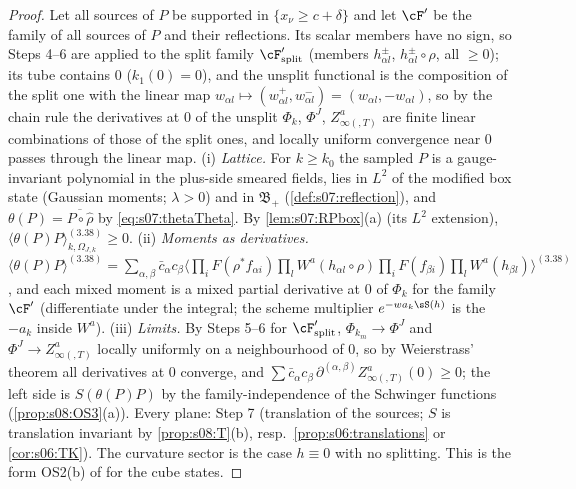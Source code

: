 \begin{proof}
Let all sources of $P$ be supported in $\{x_\nu\ge c+\delta\}$ and let $\cF'$ be the family of all sources of $P$ and their reflections. Its scalar members have no sign, so Steps 4--6 are applied to the split family $\cF'_{\rm split}$ (members $h^\pm_{\alpha l}$, $h^\pm_{\alpha l}\circ\rho$, all $\ge0$); its tube contains $0$ ($k_1(0)=0$), and the unsplit functional is the composition of the split one with the linear map $w_{\alpha l}\mapsto(w^+_{\alpha l},w^-_{\alpha l})=(w_{\alpha l},-w_{\alpha l})$, so by the chain rule the derivatives at $0$ of the unsplit $\Phi_k$, $\Phi^J$, $Z^a_{\infty(,T)}$ are finite linear combinations of those of the split ones, and locally uniform convergence near $0$ passes through the linear map. (i) \emph{Lattice.} For $k\ge k_0$ the sampled $P$ is a gauge-invariant polynomial in the plus-side smeared fields, lies in $L^2$ of the modified box state (Gaussian moments; $\lambda>0$) and in $\mathfrak B_+$ (\cref{def:s07:reflection}), and $\theta(P)=\overline{P\circ\hat\rho}$ by \eqref{eq:s07:thetaTheta}. By \cref{lem:s07:RPbox}(a) (its $L^2$ extension), $\langle\theta(P)P\rangle^{(3.38)}_{k,\Omega_{J,k}}\ge0$. (ii) \emph{Moments as derivatives.} $\langle\theta(P)P\rangle^{(3.38)}=\sum_{\alpha,\beta}\bar c_\alpha c_\beta\langle\prod_iF(\rho^*f_{\alpha i})\prod_lW^a(h_{\alpha l}\circ\rho)\prod_iF(f_{\beta i})\prod_lW^a(h_{\beta l})\rangle^{(3.38)}$, and each mixed moment is a mixed partial derivative at $0$ of $\Phi_k$ for the family $\cF'$ (differentiate under the integral; the scheme multiplier $e^{-wa_k\sS(h)}$ is the $-a_k$ inside $W^a$). (iii) \emph{Limits.} By Steps 5--6 for $\cF'_{\rm split}$, $\Phi_{k_m}\to\Phi^J$ and $\Phi^J\to Z^a_{\infty(,T)}$ locally uniformly on a neighbourhood of $0$, so by Weierstrass' theorem all derivatives at $0$ converge, and $\sum\bar c_\alpha c_\beta\,\partial^{(\alpha,\beta)}Z^a_{\infty(,T)}(0)\ge0$; the left side is $S(\theta(P)P)$ by the family-independence of the Schwinger functions (\cref{prop:s08:OS3}(a)). Every plane: Step 7 (translation of the sources; $S$ is translation invariant by \cref{prop:s08:T}(b), resp.\ \cref{prop:s06:translations} or \cref{cor:s06:TK}). The curvature sector is the case $h\equiv0$ with no splitting. This is the form OS2(b) of \cite[def:OS, thm:C-OS2]{SymPhase} for the cube states.
\end{proof}

